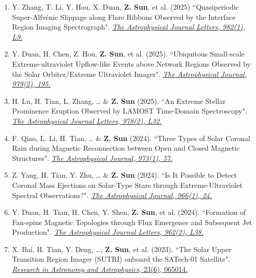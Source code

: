 \documentclass{resume}
\begin{document}
\begin{enumerate}[start=11]
\item Y. Zhang, T. Li, Y. Hou, X. Duan, \textbf{Z. Sun}, et al. (2025)  ``Quasiperiodic Super-Alfvénic Slippage along Flare Ribbons Observed by the Interface Region Imaging Spectrograph". \href{https://iopscience.iop.org/article/10.3847/2041-8213/adbb6e}{\textit{The Astrophysical Journal Letters, 982(1), L9.}}
\item Y. Duan, H. Chen, Z. Hou, \textbf{Z. Sun}, et al. (2025). ``Ubiquitous Small-scale Extreme-ultraviolet Upflow-like Events above Network Regions Observed by the Solar Orbiter/Extreme Ultraviolet Imager". \href{https://iopscience.iop.org/article/10.3847/1538-4357/ada556}{\textit{The Astrophysical Journal, 979(2), 195.}}
\item H. Lu, H. Tian, L. Zhang, … \& \textbf{Z. Sun} (2025). ``An Extreme Stellar Prominence Eruption Observed by LAMOST Time-Domain Spectroscopy". \href{https://iopscience.iop.org/article/10.3847/2041-8213/ad93cc/meta}{\textit{The Astrophysical Journal Letters, 978(2), L32.}}
\item F. Qiao, L. Li, H. Tian, … \& \textbf{Z. Sun} (2024). ``Three Types of Solar Coronal Rain during Magnetic Reconnection between Open and Closed Magnetic Structures". \href{https://iopscience.iop.org/article/10.3847/1538-4357/ad6770}{\textit{The Astrophysical Journal, 973(1), 57.}}
\item Z. Yang, H. Tian, Y. Zhu, … \& \textbf{Z. Sun} (2024). ``Is It Possible to Detect Coronal Mass Ejections on Solar-Type Stars through Extreme-Ultraviolet Spectral Observations?". \href{https://iopscience.iop.org/article/10.3847/1538-4357/ad2a44}{\textit{The Astrophysical Journal, 966(1), 24.}}
\item Y. Duan, H. Tian, H. Chen, Y. Shen, \textbf{Z. Sun}, et al.  (2024). ``Formation of Fan-spine Magnetic Topologies through Flux Emergence and Subsequent Jet Production". \href{https://iopscience.iop.org/article/10.3847/2041-8213/ad24f3/meta}{\textit{The Astrophysical Journal Letters, 962(2), L38.}}
\item X. Bai, H. Tian, Y. Deng, …, \textbf{Z. Sun}, et al. (2023). ``The Solar Upper Transition Region Imager (SUTRI) onboard the SATech-01 Satellite". \href{https://iopscience.iop.org/article/10.1088/1674-4527/accc74/meta}{\textit{Research in Astronomy and Astrophysics}, 23(6), 065014.}

\end{enumerate}



\newpage
\end{document}
